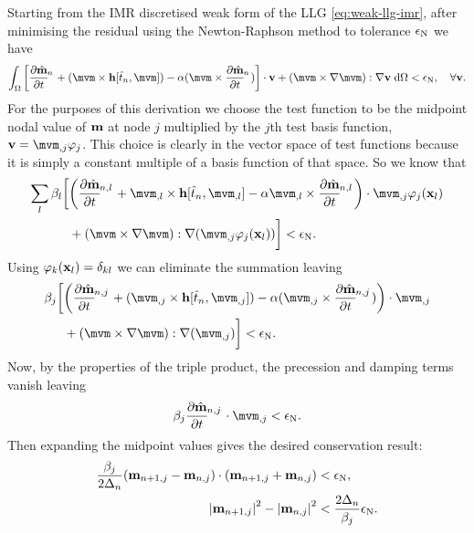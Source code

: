 Starting from the IMR discretised weak form of the LLG \eqref{eq:weak-llg-imr}, after minimising the residual using \eg the Newton-Raphson method to tolerance $\epsilon_{\text{N}}$ we have
\begin{equation}
  \intd{ \bigs{\dmdtm  + (\mvm \times \hv[\tm, \mvm]) - \dampc (\mvm \times \dmdtm)} \cdot \testv + \bigb{\mvm \times \grad \mvm} : \grad \testv} < \ntol, \quad \forall \testv.
\end{equation}
For the purposes of this derivation we choose the test function to be the midpoint nodal value of $\mathbf{m}$ at node $j$ multiplied by the $j$th test basis function, $\testv = \mvm_{,j} \tbf_j$.
This choice is clearly in the vector space of test functions because it is simply a constant multiple of a basis function of that space.
So we know that
\begin{equation}
  \begin{aligned}
    \sum_l \beta_l \bigg[& \bigb{\dmdtml + \mvm_{,l} \times \hv[\tm, \mvm_{,l}] - \dampc \mvm_{,l} \times \dmdtml} \cdot \mvm_{,j}\tbf_j(\xv_l) \\
      &+ \bigb{\mvm \times \grad \mvm} : \grad (\mvm_{,j}\tbf_j(\xv_l)) \bigg] < \ntol.
  \end{aligned}
\end{equation}
Using $\varphi_k(\mathbf{x}_l) = \delta_{kl}$ we can eliminate the summation leaving
\begin{equation}
  \begin{aligned}
    \beta_j \bigg[& \bigb{\dmdtmj  + (\mvm_{,j} \times \hv[\tm, \mvm_{,j}])  - \dampc (\mvm_{,j} \times \dmdtmj)} \cdot \mvm_{,j} \\
    &+ \bigb{\mvm \times \grad \mvm} : \grad (\mvm_{,j})
    \bigg] < \ntol.
  \end{aligned} 
\end{equation}
Now, by the properties of the triple product, the precession and damping terms vanish leaving
\begin{equation}
  \beta_j \dmdtmj \cdot  \mvm_{,j} < \ntol.
\end{equation}
Then expanding the midpoint values gives the desired conservation result:
\begin{equation}
  \begin{aligned}
    \frac{\beta_j}{2\Delta_{n}}(\mathbf{m}_{n+1,j} - \mathbf{m}_{n,j}) \cdot (\mathbf{m}_{n+1, j} + \mathbf{m}_{n, j}) &< \epsilon_{\text{N}}, \\
    \left|{\mathbf{m}_{n+1, j}} \right|^2 - \left|{\mathbf{m}_{n, j}} \right|^2 &< \frac{2\Delta_{n}}{\beta_j} \epsilon_{\text{N}}.
  \end{aligned}
\end{equation}

